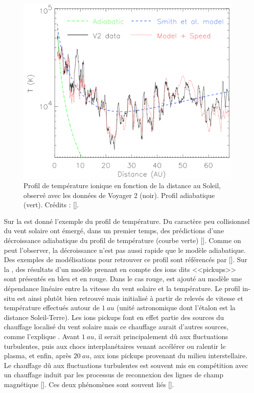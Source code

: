 \begin{figure}[!ht]
 \centering
\includegraphics[width=0.8\linewidth,trim=0.5cm 0cm 0cm 0cm, clip=true]{./Part_0/images/heating_profil}
\cprotect\caption{Profil de température ionique en fonction de la distance au Soleil, observé avec les données de Voyager 2 (noir). Profil adiabatique (vert).  Crédits : [\cite{richardson_radial_2003}].}
\label{fig:profil}
\end{figure}
Sur la  est donné l'exemple du profil de température. Du caractère peu collisionnel du vent solaire ont émergé, dans un premier temps, des prédictions d'une décroissance adiabatique du profil de température (courbe verte) [\cite{tu_mhd_1995}]. Comme on peut l'observer, la décroissance n'est pas aussi rapide que le modèle adiabatique. Des exemples de modélisations pour retrouver ce profil sont référencés par [\cite{richardson_radial_2003}]. Sur la , des résultats d'un modèle prenant en compte des ions dits <<pickups>> sont présentés en bleu et en rouge. Dans le cas rouge, est ajouté au modèle une dépendance linéaire entre la vitesse du vent solaire et la température. Le profil in-situ est ainsi plutôt bien retrouvé mais initialisé à partir de relevés de vitesse et température effectués autour de $\SI{1}{au}$ (unité astronomique dont l'étalon est la distance Soleil-Terre). Les ions pickups font en effet partie des sources du chauffage localisé du vent solaire mais ce chauffage aurait d'autres sources, comme l'explique \cite{david_energy_2022}. 
Avant $\SI{1}{au}$, il serait principalement dû aux fluctuations turbulentes, puis aux chocs interplanétaires venant accélérer ou ralentir le plasma, et enfin, après $\SI{20}{au}$, aux ions pickups provenant du milieu interstellaire. Le chauffage dû aux fluctuations turbulentes est souvent mis en compétition avec un chauffage induit par les processus de reconnexion des lignes de champ magnétique [\cite{matthaeus_who_2011,cranmer_role_2015}]. Ces deux phénomènes sont souvent liés [\cite{sundkvist_dissipation_2007,retino_situ_2007,servidio_magnetic_2011,chasapis_thin_2015,manzini_subion-scale_2023}].  

